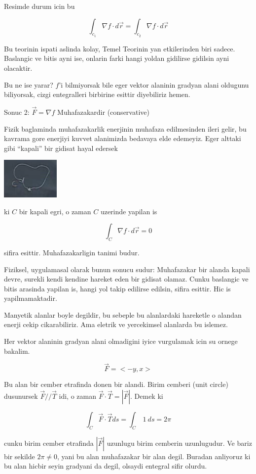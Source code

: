 \documentclass[12pt,fleqn]{article}
\begin{document}
Resimde durum icin bu

\[ \int_{c_1}\nabla f \cdot d\vec{r} =  \int_{c_2}\nabla f \cdot d\vec{r} \]

Bu teorinin ispati aslinda kolay, Temel Teorinin yan etkilerinden biri
sadece. Baslangic ve bitis ayni ise, onlarin farki hangi yoldan gidilirse
gidilsin ayni olacaktir. 

Bu ne ise yarar? $f$'i bilmiyorsak bile eger vektor alaninin gradyan alani
oldugunu biliyorsak, cizgi entegralleri birbirine esittir diyebiliriz hemen. 

Sonuc 2: $\vec{F} = \nabla f$ Muhafazakardir (conservative)

Fizik baglaminda muhafazakarlik enerjinin muhafaza edilmesinden ileri
gelir, bu kavrama gore enerjiyi kuvvet alanimizda bedavaya elde
edemeyiz. Eger alttaki gibi ``kapali'' bir gidisat hayal edersek

\includegraphics[height=2cm]{20_8.png}

ki $C$ bir kapali egri, o zaman $C$ uzerinde yapilan is

\[ \int_{C}\nabla f \cdot d\vec{r} = 0\]

sifira esittir. Muhafazakarligin tanimi budur. 

Fiziksel, uygulamasal olarak bunun sonucu sudur: Muhafazakar bir alanda
kapali devre, surekli kendi kendine hareket eden bir gidisat olamaz. Cunku
baslangic ve bitis arasinda yapilan is, hangi yol takip edilirse edilsin,
sifira esittir. Hic is yapilmamaktadir. 

Manyetik alanlar boyle degildir, bu sebeple bu alanlardaki hareketle o
alandan enerji cekip cikarabiliriz. Ama eletrik ve yercekimsel alanlarda bu
islemez. 

Her vektor alaninin gradyan alani olmadigini iyice vurgulamak icin su
ornege bakalim. 

\[ \vec{F} = <-y,x> \]

Bu alan bir cember etrafinda donen bir alandi. Birim cemberi (unit circle)
dusunursek $\vec{F} // \vec{T}$ idi, o zaman $\vec{F}\cdot\vec{T} =
|\vec{F}|$. Demek ki

\[ \int_C \vec{F}\cdot\vec{T} ds = \int_C \ 1 \ ds = 2\pi \]

cunku birim cember etrafinda $|\vec{F}|$ uzunlugu birim cemberin
uzunlugudur. Ve bariz bir sekilde $2\pi \ne 0$, yani bu alan muhafazakar
bir alan degil. Buradan anliyoruz ki bu alan hicbir seyin gradyani da
degil, olsaydi entegral sifir olurdu. 
\end{document}
